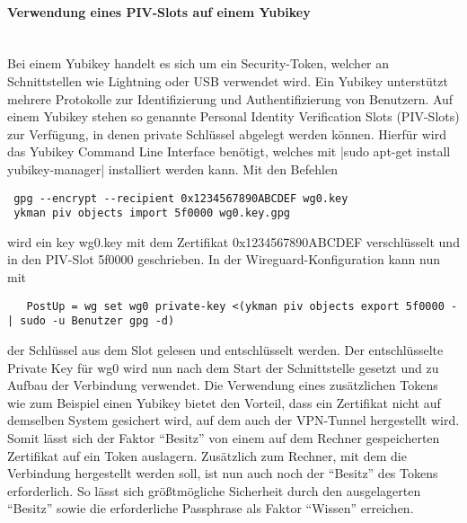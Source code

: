 \paragraph{Verwendung eines PIV-Slots auf einem Yubikey}
\noindent \\Bei einem Yubikey handelt es sich um ein Security-Token, welcher an Schnittstellen wie Lightning oder USB verwendet wird. Ein Yubikey unterst\"utzt mehrere Protokolle zur Identifizierung und Authentifizierung von Benutzern. Auf einem Yubikey stehen so genannte Personal Identity Verification Slots (PIV-Slots) zur Verf\"ugung, in denen private Schl\"ussel abgelegt werden k\"onnen. Hierf\"ur wird das Yubikey Command Line Interface ben\"otigt, welches mit |sudo apt-get install yubikey-manager| installiert werden kann. Mit den Befehlen 
\begin{verbatim}
 gpg --encrypt --recipient 0x1234567890ABCDEF wg0.key
 ykman piv objects import 5f0000 wg0.key.gpg
\end{verbatim}
wird ein key wg0.key mit dem Zertifikat 0x1234567890ABCDEF verschl\"usselt und in den PIV-Slot 5f0000 geschrieben. In der Wireguard-Konfiguration kann nun mit
\begin{verbatim}
   PostUp = wg set wg0 private-key <(ykman piv objects export 5f0000 - | sudo -u Benutzer gpg -d)
\end{verbatim}
der Schl\"ussel aus dem Slot gelesen und entschl\"usselt werden. Der entschl\"usselte Private Key für wg0 wird nun nach dem Start der Schnittstelle gesetzt  und zu Aufbau der Verbindung verwendet. Die Verwendung eines zusätzlichen Tokens wie zum Beispiel einen Yubikey bietet den Vorteil, dass ein Zertifikat nicht auf demselben System gesichert wird, auf dem auch der VPN-Tunnel hergestellt wird. Somit lässt sich der Faktor "`Besitz"' von einem auf dem Rechner gespeicherten Zertifikat auf ein Token auslagern. Zusätzlich zum Rechner, mit dem die Verbindung hergestellt werden soll, ist nun auch noch der "`Besitz"' des Tokens erforderlich. So lässt sich größtmögliche Sicherheit durch den ausgelagerten "`Besitz"' sowie die erforderliche Passphrase als Faktor "`Wissen"' erreichen.  






  
